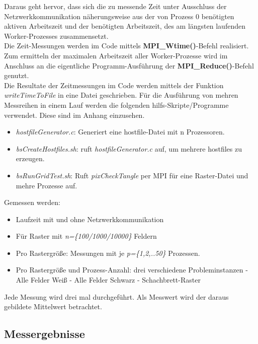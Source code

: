 \documentclass[
10pt, %
a4paper, %
oneside, %
headinclude,footinclude, %
BCOR5mm, %
]{scrartcl}
\begin{document}
Daraus geht hervor, dass sich die zu messende Zeit unter Ausschluss der Netzwerkkommunikation näherungsweise aus der von Prozess 0 benötigten aktiven Arbeitszeit und der benötigten Arbeitszeit, des am längsten laufenden Worker-Prozesses zusammensetzt.\\
Die Zeit-Messungen werden im Code mittels \textbf{MPI\_Wtime()}-Befehl realisiert. Zum ermitteln der maximalen Arbeitszeit aller Worker-Prozesse wird im Anschluss an die eigentliche Programm-Ausführung der \textbf{MPI\_Reduce()}-Befehl genutzt.\\
Die Resultate der Zeitmessungen im Code werden mittels der Funktion \textit{writeTimeToFile} in eine Datei geschrieben. 
Für die Ausführung von mehren Messreihen in einem Lauf werden die folgenden hilfs-Skripte/Programme verwendet. Diese sind im Anhang einzusehen.\\
\begin{itemize}[noitemsep] %
	\item \textit{hostfileGenerator.c}: Generiert eine hostfile-Datei mit n Prozessoren.
	\item \textit{bsCreateHostfiles.sh}: ruft \textit{hostfileGenerator.c} auf, um mehrere  hostfiles zu erzeugen.
	\item \textit{bsRunGridTest.sh}: Ruft \textit{pixCheckTangle} per MPI für eine Raster-Datei und mehre Prozesse auf.
\end{itemize}

Gemessen werden:
\begin{itemize}[noitemsep] %
	\item Laufzeit mit und ohne Netzwerkkommunikation
	\item Für Raster mit \textit{n=\{100/1000/10000\}} Feldern
	\item Pro Rastergröße: Messungen mit je \textit{p=\{1,2,..50\}} Prozessen.
	\item Pro Rastergröße und Prozess-Anzahl: drei verschiedene Probleminstanzen 
	\subitem - Alle Felder Weiß
	\subitem - Alle Felder Schwarz
	\subitem - Schachbrett-Raster
\end{itemize}

Jede Messung wird drei mal durchgeführt. Als Messwert wird der daraus gebildete Mittelwert betrachtet.

\subsection{Messergebnisse}
\end{document}
